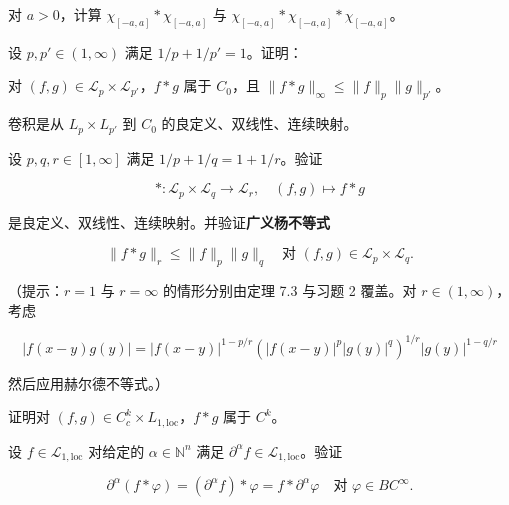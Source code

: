 \begin{exercises}
\item

对 $ a > 0 $，计算 $ \chi_{[-a,a]} * \chi_{[-a,a]} $ 与 $ \chi_{[-a,a]} * \chi_{[-a,a]} * \chi_{[-a,a]} $。

\item

设 $ p, p' \in (1, \infty) $ 满足 $ 1/p + 1/p' = 1 $。证明：

\begin{items}
\item

对 $ (f, g) \in \mathcal{L}_p \times \mathcal{L}_{p'} $，$ f * g $ 属于 $ C_0 $，且 $ \|f * g\|_\infty \le \|f\|_p \|g\|_{p'} $。

\item

卷积是从 $ L_p \times L_{p'} $ 到 $ C_0 $ 的良定义、双线性、连续映射。

\end{items}

\item

设 $ p, q, r \in [1, \infty] $ 满足 $ 1/p + 1/q = 1 + 1/r $。验证

\[
* : \mathcal{L}_p \times \mathcal{L}_q \to \mathcal{L}_r , \quad (f, g) \mapsto f * g
\]

是良定义、双线性、连续映射。并验证\textbf{广义杨不等式}

\[
\|f * g\|_r \le \|f\|_p \|g\|_q \quad \text{对 } (f, g) \in \mathcal{L}_p \times \mathcal{L}_q .
\]

（提示：$ r = 1 $ 与 $ r = \infty $ 的情形分别由定理 7.3 与习题 2 覆盖。对 $ r \in (1, \infty) $，考虑

\[
|f(x - y)g(y)| = |f(x - y)|^{1-p/r} \left( |f(x - y)|^p |g(y)|^q \right)^{1/r} |g(y)|^{1-q/r}
\]

然后应用赫尔德不等式。）

\item

证明对 $ (f, g) \in C_c^k \times L_{1,\mathrm{loc}} $，$ f * g $ 属于 $ C^k $。

\item

设 $ f \in \mathcal{L}_{1,\mathrm{loc}} $ 对给定的 $ \alpha \in \mathbb{N}^n $ 满足 $ \partial^\alpha f \in \mathcal{L}_{1,\mathrm{loc}} $。验证

\[
\partial^\alpha (f * \varphi) = (\partial^\alpha f) * \varphi = f * \partial^\alpha \varphi \quad \text{对 } \varphi \in BC^\infty .
\]
\item


\end{exercises}
